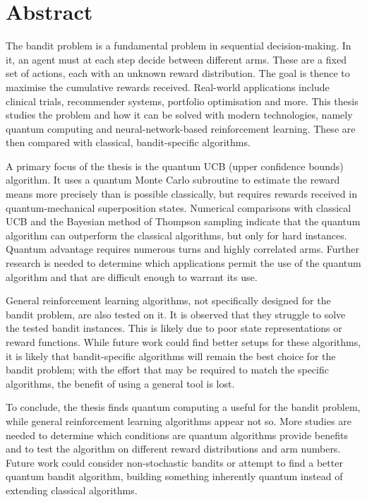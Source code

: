 \chapter{Abstract}

The bandit problem is a fundamental problem in sequential decision-making.
In it, an agent must at each step decide between different arms.
These are a fixed set of actions, each with an unknown reward distribution.
The goal is thence to maximise the cumulative rewards received.
Real-world applications include clinical trials, recommender systems, portfolio optimisation and more.
This thesis studies the problem and how it can be solved with modern technologies, namely quantum computing and neural-network-based reinforcement learning.
These are then compared with classical, bandit-specific algorithms.

A primary focus of the thesis is the quantum UCB (upper confidence bounds) algorithm.
It uses a quantum Monte Carlo subroutine to estimate the reward means more precisely than is possible classically, but requires rewards received in quantum-mechanical superposition states.
Numerical comparisons with classical UCB and the Bayesian method of Thompson sampling indicate that the quantum algorithm can outperform the classical algorithms, but only for hard instances.
Quantum advantage requires numerous turns and highly correlated arms.
Further research is needed to determine which applications permit the use of the quantum algorithm and that are difficult enough to warrant its use.

General reinforcement learning algorithms, not specifically designed for the bandit problem, are also tested on it.
It is observed that they struggle to solve the tested bandit instances.
This is likely due to poor state representations or reward functions.
While future work could find better setups for these algorithms, it is likely that bandit-specific algorithms will remain the best choice for the bandit problem; with the effort that may be required to match the specific algorithms, the benefit of using a general tool is lost.

To conclude, the thesis finds quantum computing a useful for the bandit problem, while general reinforcement learning algorithms appear not so.
More studies are needed to determine which conditions are quantum algorithms provide benefits and to test the algorithm on different reward distributions and arm numbers.
Future work could consider non-stochastic bandits or attempt to find a better quantum bandit algorithm, building something inherently quantum instead of extending classical algorithms.

\cleardoublepage